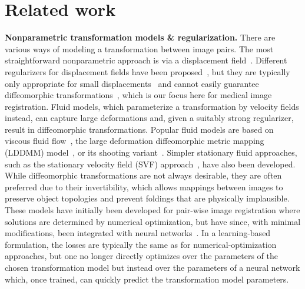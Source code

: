 \section{Related work}
\label{sec:related_work}
\vspace{-0.15cm}
\noindent
\textbf{Nonparametric transformation models \& regularization.} There are various ways of modeling a transformation between image pairs. The most straightforward nonparametric approach is via a displacement field~\cite{thirion1998image}. Different regularizers for displacement fields have been proposed~\cite{holden2007review}, but they are typically only appropriate for small displacements~\cite{modersitzki2003numerical} and cannot easily guarantee diffeomorphic transformations~\cite{ashburner2007fast}, which is our focus here for medical image registration. Fluid models, which parameterize a transformation by velocity fields instead, can capture large deformations and, given a suitably strong regularizer, result in diffeomorphic transformations. Popular fluid models are based on viscous fluid flow~\cite{christensen19943d,christensen1996deformable}, the large deformation diffeomorphic metric mapping (LDDMM) model~\cite{beg2005computing}, or its shooting variant~\cite{miller2006geodesic,vialard2012diffeomorphic}. Simpler stationary fluid approaches, such as the stationary velocity field (SVF) approach~\cite{arsigny2009fast,vercauteren2008symmetric}, have also been developed. While diffeomorphic transformations are not always desirable, they are often preferred due to their invertibility, which allows mappings between images to preserve object topologies and prevent foldings that are physically implausible. These models have initially been developed for pair-wise image registration where solutions are determined by numerical optimization, but have since, with minimal modifications, been integrated with neural networks~\cite{yang2017quicksilver,balakrishnan2019voxelmorph,shen2019networks}. In a learning-based formulation, the losses are typically the same as for numerical-optimization approaches, but one no longer directly optimizes over the parameters of the chosen transformation model but instead over the parameters of a neural network which, once trained, can quickly predict the transformation model parameters.


